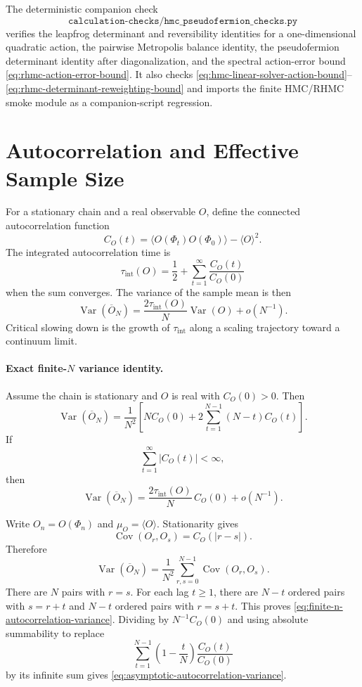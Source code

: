 The deterministic companion check
\[
  \texttt{calculation-checks/hmc\_pseudofermion\_checks.py}
\]
verifies the leapfrog determinant and reversibility identities for a
one-dimensional quadratic action, the pairwise Metropolis balance identity,
the pseudofermion determinant identity after diagonalization, and the
spectral action-error bound \eqref{eq:rhmc-action-error-bound}.  It also
checks \eqref{eq:hmc-linear-solver-action-bound}--
\eqref{eq:rhmc-determinant-reweighting-bound} and imports the finite HMC/RHMC
smoke module as a companion-script regression.

\section{Autocorrelation and Effective Sample Size}

For a stationary chain and a real observable \(O\), define the connected
autocorrelation function
\[
  C_O(t)
  =
  \langle O(\Phi_t)O(\Phi_0)\rangle
  -\langle O\rangle^2 .
\]
The integrated autocorrelation time is
\[
  \tau_{\mathrm{int}}(O)
  =
  \frac12+\sum_{t=1}^\infty\frac{C_O(t)}{C_O(0)}
\]
when the sum converges.  The variance of the sample mean is then
\[
  \operatorname{Var}(\overline O_N)
  =
  \frac{2\tau_{\mathrm{int}}(O)}{N}
  \operatorname{Var}(O)
  +o(N^{-1}).
\]
Critical slowing down is the growth of \(\tau_{\mathrm{int}}\) along a scaling
trajectory toward a continuum limit.

\paragraph{Exact finite-\(N\) variance identity.}
Assume the chain is stationary and \(O\) is real with \(C_O(0)>0\).  Then
\begin{equation}
  \operatorname{Var}(\overline O_N)
  =
  \frac{1}{N^2}
  \left[
    NC_O(0)+2\sum_{t=1}^{N-1}(N-t)C_O(t)
  \right].
  \label{eq:finite-n-autocorrelation-variance}
\end{equation}
If
\begin{equation}
  \sum_{t=1}^{\infty}|C_O(t)|<\infty ,
  \label{eq:autocorrelation-absolute-summability}
\end{equation}
then
\begin{equation}
  \operatorname{Var}(\overline O_N)
  =
  \frac{2\tau_{\mathrm{int}}(O)}{N}\,C_O(0)+o(N^{-1}).
  \label{eq:asymptotic-autocorrelation-variance}
\end{equation}

Write \(O_n=O(\Phi_n)\) and
\(\mu_O=\langle O\rangle\).  Stationarity gives
\[
  \operatorname{Cov}(O_r,O_s)=C_O(|r-s|).
\]
Therefore
\[
  \operatorname{Var}(\overline O_N)
  =
  \frac1{N^2}
  \sum_{r,s=0}^{N-1}\operatorname{Cov}(O_r,O_s).
\]
There are \(N\) pairs with \(r=s\).  For each lag \(t\geq1\), there are
\(N-t\) ordered pairs with \(s=r+t\) and \(N-t\) ordered pairs with
\(r=s+t\).  This proves
\eqref{eq:finite-n-autocorrelation-variance}.  Dividing by \(N^{-1}C_O(0)\)
and using absolute summability to replace
\[
  \sum_{t=1}^{N-1}\left(1-\frac{t}{N}\right)\frac{C_O(t)}{C_O(0)}
\]
by its infinite sum gives
\eqref{eq:asymptotic-autocorrelation-variance}.

